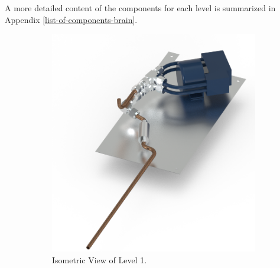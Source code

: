 \documentclass[a4paper,12pt,oneside]{article} %
\providecommand{\DIFaddbeginFL}{} %
\providecommand{\DIFaddendFL}{} %
\providecommand{\DIFdelbeginFL}{} %
\providecommand{\DIFdelendFL}{} %
\newcommand{\DIFscaledelfig}{0.5}
\newlength{\DIFdelgraphicswidth} %
\newlength{\DIFdelgraphicsheight} %
\newcommand{\DIFaddincludegraphics}[2][]{{\color{blue}\fbox{\DIFOincludegraphics[#1]{#2}}}} %
\newcommand{\DIFdelincludegraphics}[2][]{%
\sbox{\DIFdelgraphicsbox}{\DIFOincludegraphics[#1]{#2}}%
\settoboxwidth{\DIFdelgraphicswidth}{\DIFdelgraphicsbox} %
\settoboxtotalheight{\DIFdelgraphicsheight}{\DIFdelgraphicsbox} %
\scalebox{\DIFscaledelfig}{%
\parbox[b]{\DIFdelgraphicswidth}{\usebox{\DIFdelgraphicsbox}\\[-\baselineskip] \rule{\DIFdelgraphicswidth}{0em}}\llap{\resizebox{\DIFdelgraphicswidth}{\DIFdelgraphicsheight}{%
\setlength{\unitlength}{\DIFdelgraphicswidth}%
\begin{picture}(1,1)%
\thicklines\linethickness{2pt} %
{\color[rgb]{1,0,0}\put(0,0){\framebox(1,1){}}}%
{\color[rgb]{1,0,0}\put(0,0){\line( 1,1){1}}}%
{\color[rgb]{1,0,0}\put(0,1){\line(1,-1){1}}}%
\end{picture}%
}\hspace*{3pt}}} %
} %
\DeclareRobustCommand{\DIFaddbeginFL}{\DIFOaddbeginFL \let\includegraphics\DIFaddincludegraphics} %
\DeclareRobustCommand{\DIFaddendFL}{\DIFOaddendFL \let\includegraphics\DIFOincludegraphics} %
\DeclareRobustCommand{\DIFdelbeginFL}{\DIFOdelbeginFL \let\includegraphics\DIFdelincludegraphics} %
\DeclareRobustCommand{\DIFdelendFL}{\DIFOaddendFL \let\includegraphics\DIFOincludegraphics} %
\begin{document}
A more detailed content of the components for each level is summarized in Appendix \ref{list-of-components-brain}.
\begin{figure}[H]
    \centering
    \begin{subfigure}[b]{0.3\textwidth}
    \centering
    \DIFdelbeginFL %
\DIFdelendFL \DIFaddbeginFL \includegraphics[width=\textwidth]{4-experiment-design/img/Mechanical/Figure_24a.png}
    \DIFaddendFL \caption{Isometric View of Level 1.}
    \label{level_1}
    \end{subfigure}
    ~
    \begin{subfigure}[b]{0.3\textwidth}
    \centering
    \DIFdelbeginFL %

\end{subfigure}
\end{figure}
\end{document}
